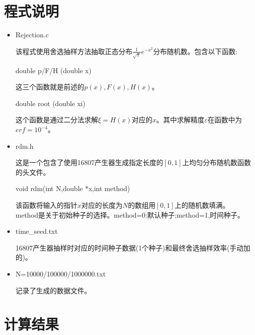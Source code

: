 \documentclass[UTF8]{ctexart}
\begin{document}
	\section{程式说明}
	\begin{itemize}
		\item Rejection.c
		
		该程式使用舍选抽样方法抽取正态分布$\frac{1}{\sqrt{\pi}}e^{-x^2}$分布随机数。包含以下函数:
		
		\subitem double p/F/H (double x)
		
		这三个函数就是前述的$p(x),F(x),H(x)$。
		
		\subitem double root (double xi)
		
		这个函数是通过二分法求解$\xi=H(x)$对应的$x$。其中求解精度$\varepsilon$在函数中为$erf=10^{-4}$。
		
		\item rdm.h
			
		这是一个包含了使用16807产生器生成指定长度的$[0,1]$上均匀分布随机数函数的头文件。
		
		\subitem void rdm(int N,double *x,int method)
		
		该函数将输入的指针$x$对应的长度为$N$的数组用$[0,1]$上的随机数填满。method是关于初始种子的选择。method=0:默认种子;method=1,时间种子。
		
		\item time\_seed.txt
		
		16807产生器抽样时对应的时间种子数据(1个种子)和最终舍选抽样效率(手动加的)。
		
		\item N=10000/100000/1000000.txt
		
		记录了生成的数据文件。
	\end{itemize}
	
	\section{计算结果}

	
%	
	
\end{document}
